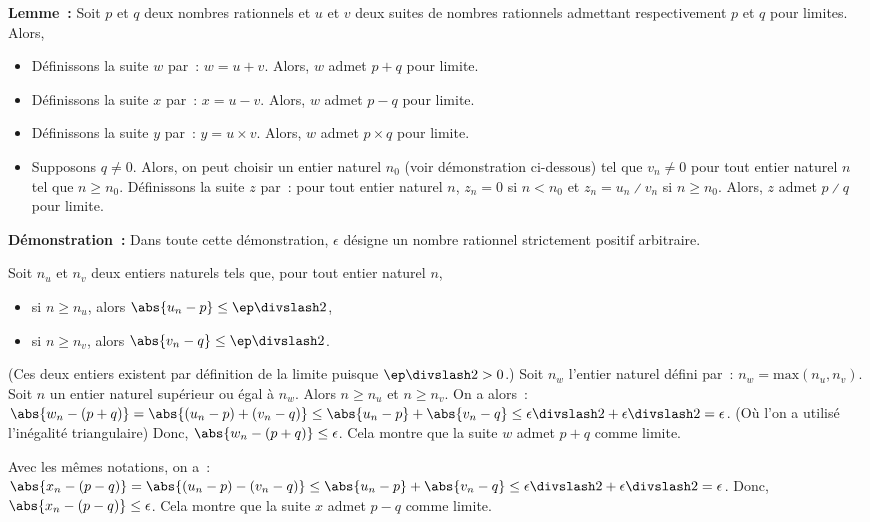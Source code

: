 \noindent\textbf{Lemme :} Soit $p$ et $q$ deux nombres rationnels et $u$ et $v$ deux suites de nombres rationnels admettant respectivement $p$ et $q$ pour limites. 
    Alors, 
    \begin{itemize}[nosep]
        \item Définissons la suite $w$ par : $w = u + v$. 
            Alors, $w$ admet $p + q$ pour limite.
        \item Définissons la suite $x$ par : $x = u - v$. 
            Alors, $w$ admet $p - q$ pour limite.
        \item Définissons la suite $y$ par : $y = u \times v$. 
            Alors, $w$ admet $p \times q$ pour limite.
        \item Supposons $q \neq 0$. 
            Alors, on peut choisir un entier naturel $n_0$ (voir démonstration ci-dessous) tel que $v_n \neq 0$ pour tout entier naturel $n$ tel que $n \geq n_0$.
            Définissons la suite $z$ par : pour tout entier naturel $n$, $z_n = 0$ si $n < n_0$ et $z_n = u_n \divslash v_n$ si $n \geq n_0$.
            Alors, $z$ admet $p \divslash q$ pour limite.
    \end{itemize}

\medskip

\noindent\textbf{Démonstration :}
    Dans toute cette démonstration, $\epsilon$ désigne un nombre rationnel strictement positif arbitraire.

    Soit $n_u$ et $n_v$ deux entiers naturels tels que, pour tout entier naturel $n$, 
    \begin{itemize}[nosep]
        \item si $n \geq n_u$, alors $\abs{u_n - p} \leq \ep \divslash 2$, 
        \item si $n \geq n_v$, alors $\abs{v_n - q} \leq \ep \divslash 2$. 
    \end{itemize}
    (Ces deux entiers existent par définition de la limite puisque $\ep \divslash 2 > 0$.)
    Soit $n_w$ l'entier naturel défini par : $n_w = \mathrm{max}(n_u, n_v)$. 
    Soit $n$ un entier naturel supérieur ou égal à $n_w$. 
    Alors $n \geq n_u$ et $n \geq n_v$. 
    On a alors : $\abs{w_n - (p+q)} = \abs{(u_n-p) + (v_n-q)} \leq \abs{u_n-p} + \abs{v_n-q} \leq \epsilon \divslash 2 + \epsilon \divslash 2 = \epsilon$.
    (Où l'on a utilisé l'inégalité triangulaire)
    Donc, $\abs{w_n - (p+q)} \leq \epsilon$.
    Cela montre que la suite $w$ admet $p+q$ comme limite.

    Avec les mêmes notations, on a : $\abs{x_n - (p-q)} = \abs{(u_n-p) - (v_n-q)} \leq \abs{u_n-p} + \abs{v_n-q} \leq \epsilon \divslash 2 + \epsilon \divslash 2 = \epsilon$.
    Donc, $\abs{x_n - (p-q)} \leq \epsilon$.
    Cela montre que la suite $x$ admet $p-q$ comme limite.

